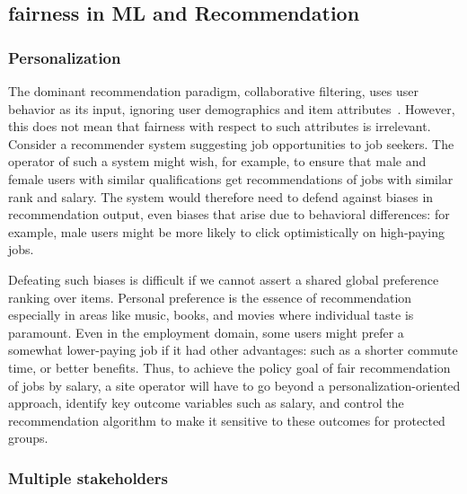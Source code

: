 \subsection{fairness in ML and Recommendation}

\subsubsection{Personalization}

The dominant recommendation paradigm, collaborative filtering, uses user behavior as its input, ignoring user demographics and item attributes~\cite{koren2015advances}. However, this does not mean that fairness with respect to such attributes is irrelevant. Consider a recommender system suggesting job opportunities to job seekers. The operator of such a system might wish, for example, to ensure that male and female users with similar qualifications get recommendations of jobs with similar rank and salary. The system would therefore need to defend against biases in recommendation output, even biases that arise due to behavioral differences: for example, male users might be more likely to click optimistically on high-paying jobs.

Defeating such biases is difficult if we cannot assert a shared global preference ranking over items. Personal preference is the essence of recommendation especially in areas like music, books, and movies where individual taste is paramount. Even in the employment domain, some users might prefer a somewhat lower-paying job if it had other advantages: such as a shorter commute time, or better benefits. Thus, to achieve the policy goal of fair recommendation of jobs by salary, a site operator will have to go beyond a personalization-oriented approach, identify key outcome variables such as salary, and control the recommendation algorithm to make it sensitive to these outcomes for protected groups.

\subsubsection{Multiple stakeholders}

